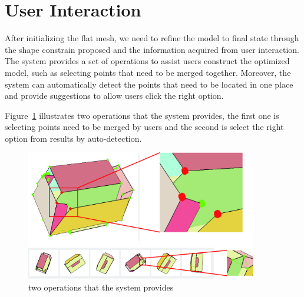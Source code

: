 \section{User Interaction}\label{sec:interaction}
After initializing the flat mesh, we need to refine the model to final state through the shape constrain proposed and the information acquired from user interaction. The system provides a set of operations to assist users construct the optimized model, such as selecting points that need to be merged together. Moreover, the system can automatically detect the points that need to be located in one place and provide suggestions to allow users click the right option.

Figure~\ref{fig:interface} illustrates two operations that the system provides, the first one is selecting points need to be merged by users and the second is select the right option from results by auto-detection.   

\begin{figure}
	\centering
	\includegraphics[width=0.9\textwidth]{images/UIdetail.jpg}
	\caption{two operations that the system provides}
	\label{fig:interface}
\end{figure}